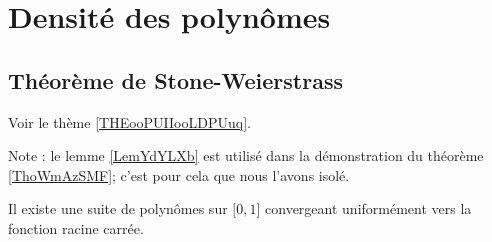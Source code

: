 
\section{Densité des polynômes}

\subsection{Théorème de Stone-Weierstrass}

Voir le thème \ref{THEooPUIIooLDPUuq}.

Note : le lemme \ref{LemYdYLXb} est utilisé dans la démonstration du théorème \ref{ThoWmAzSMF}; c'est pour cela que nous l'avons isolé.

\begin{lemma}       \label{LemYdYLXb}
    Il existe une suite de polynômes sur \( \mathopen[ 0 , 1 \mathclose]\) convergeant uniformément vers la fonction racine carrée.
\end{lemma}

